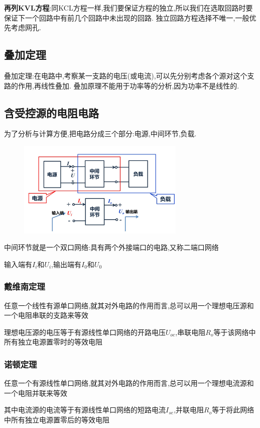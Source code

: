\documentclass[12pt,a4paper,oneside]{ctexart}
\begin{document}
\textbf{再列KVL方程}:同KCL方程一样,我们要保证方程的独立,所以我们在选取回路时要保证下一个回路中有前几个回路中未出现的回路.
独立回路方程选择不唯一,一般优先考虑网孔.

\subsection{叠加定理}
叠加定理:在电路中,考察某一支路的电压(或电流),可以先分别考虑各个源对这个支路的作用,再线性叠加.
叠加原理不能用于功率等的分析,因为功率不是线性的.

\subsection{含受控源的电阻电路}
为了分析与计算方便,把电路分成三个部分:电源,中间环节,负载.
\begin{figure}[H]
    \centering
    \includegraphics[width=8cm]{photos/双口网络.png}
\end{figure}

中间环节就是一个双口网络:具有两个外接端口的电路,又称二端口网络

输入端有$I_i$和$U_i$,输出端有$I_0$和$U_0$

\subsubsection{戴维南定理}
任意一个线性有源单口网络,就其对外电路的作用而言,总可以用一个理想电压源和一个电阻串联的支路来等效

理想电压源的电压等于有源线性单口网络的开路电压$U_{oc}$,串联电阻$R_o$等于该网络中所有独立电源置零时的等效电阻

\subsubsection{诺顿定理}
任意一个有源线性单口网络,就其对外电路的作用而言,总可以用一个理想电流源和一个电阻并联来等效

其中电流源的电流等于有源线性单口网络的短路电流$I_{se}$,并联电阻$R_o$等于将此网络中所有独立电源置零后的等效电阻
\end{document}
